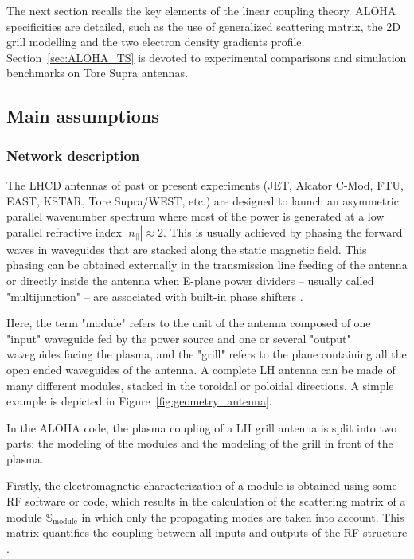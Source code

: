 The next section recalls the key elements of the linear coupling theory. ALOHA specificities are detailed, such as the use of generalized scattering matrix, the 2D grill modelling and the two electron density gradients profile. Section~\ref{sec:ALOHA_TS} is devoted to experimental comparisons and simulation benchmarks on Tore Supra antennas. 


\subsection{Main assumptions}\label{sec:Theory}

\subsubsection{Network description}\label{sec:network_description}

The LHCD antennas of past or present experiments (JET, Alcator C-Mod, FTU, EAST, KSTAR, Tore Supra/WEST, etc.) are designed to launch an asymmetric parallel wavenumber spectrum where most of the power is generated at a low parallel refractive index $\left|n_{\parallel}\right|\approx2$. This is usually achieved by phasing the forward waves in waveguides that are stacked along the static magnetic field. This phasing can be obtained externally in the transmission line feeding of the antenna  or directly inside the antenna when E-plane power dividers -- usually called "multijunction"  -- are associated with built-in phase shifters .

Here, the term "module" refers to the unit of the antenna composed of one "input" waveguide fed by the power source and one or several "output" waveguides facing the plasma, and the "grill" refers to the plane containing all the open ended waveguides of the antenna. A complete LH antenna can be made of many different modules, stacked in the toroidal or poloidal directions. A simple example is depicted in Figure~\ref{fig:geometry_antenna}.

In the ALOHA code, the plasma coupling of a LH grill antenna is split into two parts: the modeling of the modules and the modeling of the grill in front of the plasma. 

Firstly, the electromagnetic characterization of a module is obtained using some RF software or code, which results in the calculation of the scattering matrix of a module $\mathbb{S}_{\mbox{module}}$ in which only the propagating modes are taken into account. This matrix quantifies the coupling between all inputs and outputs of the RF structure \cite{kurokawa1965}. 

